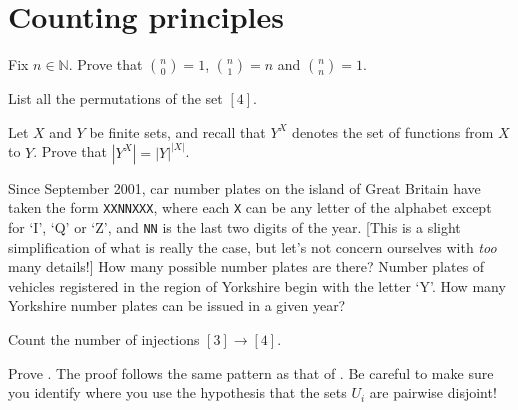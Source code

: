 \section{Counting principles}


\begin{exercise}
Fix $n \in \mathbb{N}$. Prove that $\binom{n}{0} = 1$, $\binom{n}{1} = n$ and $\binom{n}{n} = 1$.
\end{exercise}



\begin{exercise}
List all the permutations of the set $[4]$.
\end{exercise}


\begin{exercise}
Let $X$ and $Y$ be finite sets, and recall that $Y^X$ denotes the set of functions from $X$ to $Y$. Prove that $|Y^X|=|Y|^{|X|}$.
\end{exercise}

\begin{exercise}
Since September 2001, car number plates on the island of Great Britain have taken the form \texttt{XX\;NN\;XXX}, where each \texttt{X} can be any letter of the alphabet except for `I', `Q' or `Z', and \texttt{NN} is the last two digits of the year. [This is a slight simplification of what is really the case, but let's not concern ourselves with \textit{too} many details!] How many possible number plates are there? Number plates of vehicles registered in the region of Yorkshire begin with the letter `Y'. How many Yorkshire number plates can be issued in a given year?
\end{exercise}


\begin{exercise}
Count the number of injections $[3] \to [4]$.
\end{exercise}


\begin{exercise}
Prove . The proof follows the same pattern as that of . Be careful to make sure you identify where you use the hypothesis that the sets $U_i$ are pairwise disjoint!
\end{exercise}



